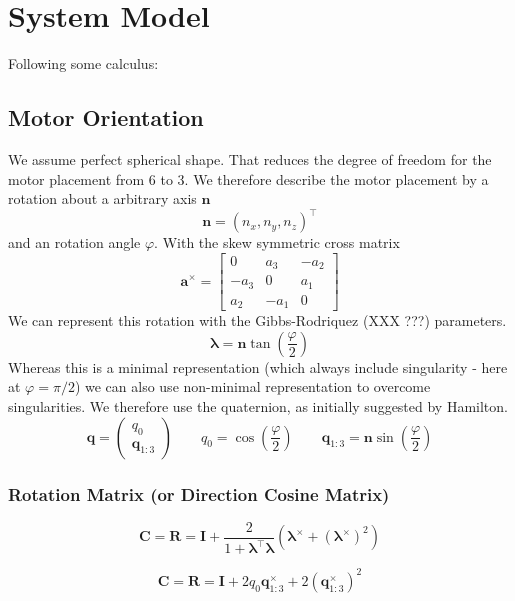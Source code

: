 \chapter{System Model}
\label{sec:sysmod}

Following some calculus:

\section{Motor Orientation}
We assume perfect spherical shape. That reduces the degree of freedom for the motor placement from 6 to 3. We therefore describe the motor placement by a rotation about a arbitrary axis $\mathbf{n}$
\begin{equation}
\mathbf{n} = \left(n_x, n_y, n_z\right)^\top
\end{equation}
and an rotation angle $\varphi$.
With the skew symmetric cross matrix
\begin{equation}
\textbf{a}^\times = \left[
\begin{array}{ccc}
0 & a_3 & -a_2 \\
-a_3 & 0 & a_1 \\
a_2 & -a_1 & 0
\end{array} \right]
\end{equation}
We can represent this rotation with the Gibbs-Rodriquez (XXX ???) parameters.
\begin{equation}
\boldsymbol{\lambda} = \mathbf{n}\tan{\left(\frac{\varphi}{2}\right)}
\end{equation}
Whereas this is a minimal representation (which always include singularity - here at $\varphi=\pi / 2$) we can also use non-minimal representation to overcome singularities. We therefore use the quaternion, as initially suggested by Hamilton.
\begin{equation}
\mathbf{q} = \left( \begin{array}{c} 
q_0 \\ \mathbf{q}_{1:3} 
\end{array} \right) \qquad
q_0 = \cos\left(\frac{\varphi}{2}\right) \qquad
\mathbf{q}_{1:3} = \mathbf{n}\sin\left(\frac{\varphi}{2}\right)
\end{equation}

\subsection{Rotation Matrix (or Direction Cosine Matrix)}
\begin{equation}
\mathbf{C} = \mathbf{R} = \mathbf{I} + \frac{2}{1+\boldsymbol{\lambda}^\top \boldsymbol{\lambda}}
\left(\boldsymbol{\lambda}^\times + \left(\boldsymbol{\lambda}^\times\right)^2\right)
\end{equation}


\begin{equation}
\mathbf{C} = \mathbf{R} = \mathbf{I} + 2 q_0 \mathbf{q}_{1:3}^\times + 2 \left(\mathbf{q}_{1:3}^\times\right)^2
\end{equation}
